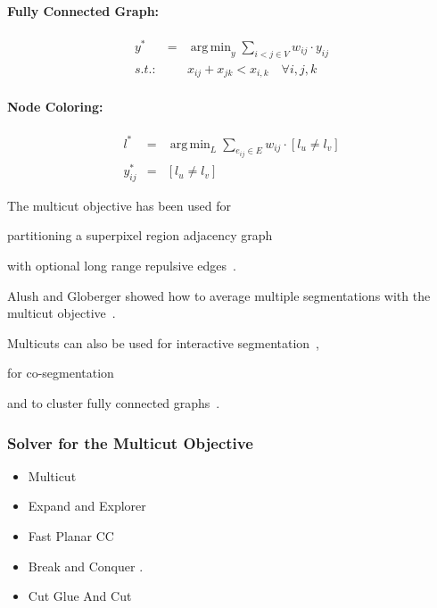 \documentclass[10pt,twocolumn,letterpaper]{article}
\DeclareMathOperator*{\argmin}{arg\,min}
\begin{document}
\paragraph{Fully Connected Graph:}
\begin{center}
    \begin{eqnarray}
        y^*   & = & \argmin_{y} \sum_{ i<j \in V } w_{ij} \cdot y_{ij} \\
        s.t.: &  & x_{ij} + x_{jk} < x_{i,k} \quad \forall i, j, k   \nonumber
    \end{eqnarray}
\end{center}

\paragraph{Node Coloring:}
\begin{center}
    \begin{eqnarray}
        l^* &=& \argmin_{L} \sum_{ e_{ij} \in E } w_{ij} \cdot [l_{u} \neq l_{v}] \\
        y_{ij}^* &=& [l_{u} \neq l_{v}]  
    \end{eqnarray}
\end{center}

The multicut objective has been used for
\begin{inparaenum}[(i)]
    \item partitioning a superpixel region adjacency graph~\cite{andres_2011_iccv,kroeger_2012_eccv}
    \item with optional long range repulsive edges~\cite{andres_2013_emmcvpr}.
    \item Alush and Globerger showed how to average multiple segmentations with the multicut objective~\cite{alush_2012_pami}.
    \item Multicuts can also be used for interactive segmentation~\cite{bagon_2011_arxiv},
    \item for co-segmentation~\cite{glassner_2011_cvpr}
    \item and to cluster fully connected graphs~\cite{???}.
\end{inparaenum}


\subsubsection{Solver for the Multicut Objective}
    
    


   \begin{itemize}
   \item Multicut~\cite{kappes_2011_emmcvpr}
   \item Expand and Explorer~\cite{bagon_2011_arxiv}
   \item Fast Planar CC~\cite{yarkony_2012_eccv}
   \item Break and Conquer \cite{alush_2013_simbad}.
   \item Cut Glue And Cut~\cite{beier_2014_cvpr}
   \end{itemize}
\end{document}
